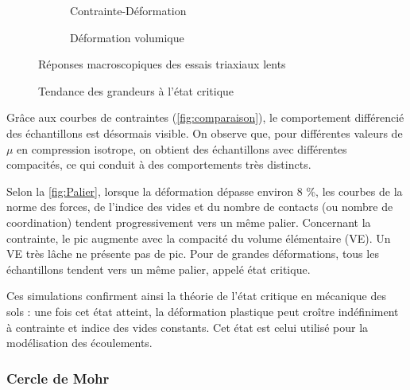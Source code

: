\documentclass[a4paper,12pt]{report}
\begin{document}
\begin{figure}[htbp]
    \centering
    \begin{subfigure}[b]{0.49\textwidth}
        \centering
        \scalebox{0.5}{}
        \caption{Contrainte-Déformation}
        \label{fig:contrainte}
    \end{subfigure}
    \hfill
    \begin{subfigure}[b]{0.49\textwidth}
        \centering
        \scalebox{0.5}{}
        \caption{Déformation volumique}
        \label{fig:defvo}
    \end{subfigure}
    \caption{Réponses macroscopiques des essais triaxiaux lents}
    \label{fig:comparaison}
\end{figure}

\begin{figure}[h!]
    \centering
    \caption{Tendance des grandeurs à l’état critique}
    \label{fig:Palier}
\end{figure}

Grâce aux courbes de contraintes (\autoref{fig:comparaison}), le comportement différencié des échantillons est désormais visible.  
On observe que, pour différentes valeurs de $\mu$ en compression isotrope, on obtient des échantillons avec différentes compacités, ce qui conduit à des comportements très distincts.  

Selon la \autoref{fig:Palier}, lorsque la déformation dépasse environ 8  \%, les courbes de la norme des forces, de l’indice des vides et du nombre de contacts (ou nombre de coordination) tendent progressivement vers un même palier.  
Concernant la contrainte, le pic augmente avec la compacité du volume élémentaire (VE). Un VE très lâche ne présente pas de pic. Pour de grandes déformations, tous les échantillons tendent vers un même palier, appelé état critique.  

Ces simulations confirment ainsi la théorie de l’état critique en mécanique des sols : une fois cet état atteint, la déformation plastique peut croître indéfiniment à contrainte et indice des vides constants.  
Cet état est celui utilisé pour la modélisation des écoulements.

\subsubsection{Cercle de Mohr}
\end{document}
